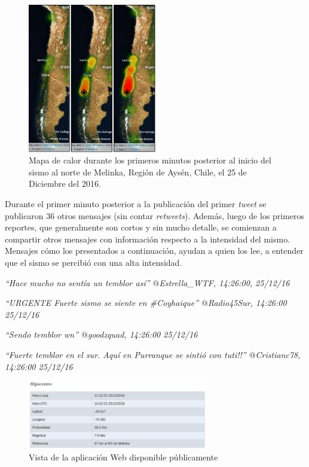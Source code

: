 	\begin{figure}[!ht]
	  \centering
	  \includegraphics[trim={0 0 0 0}, clip, width=0.5\textwidth]{imagenes/heatmap.pdf}
	  \caption{Mapa de calor durante los primeros minutos posterior al inicio del sismo al norte de Melinka, Región de Aysén, Chile, el 25 de Diciembre del 2016.}
		\label{fig:heatmap-timelapse}
	\end{figure}	
	
	Durante el primer minuto posterior a la publicación del primer \textit{tweet} se publicaron 36 otros mensajes (sin contar \textit{retweets}). Además, luego de los primeros reportes, que generalmente son cortos y sin mucho detalle, se comienzan a compartir otros mensajes con información respecto a la intensidad del mismo. Mensajes cómo los presentados a continuación, ayudan a quien los lee, a entender que el sismo se percibió con una alta intensidad. 
	

\textit{``Hace mucho no sentía un temblor así'' $@$Estrella\_WTF, 14:26:00, 25/12/16}

\textit{``URGENTE Fuerte sismo se siente en \#Coyhaique'' $@$Radio45Sur, 14:26:00 25/12/16}

\textit{``Sendo temblor wn'' $@$goodzquad, 14:26:00 25/12/16}

\textit{``Fuerte temblor en el sur. Aquí en Purranque se sintió con tuti!!'' $@$Cristianc78, 14:26:00 25/12/16}

	\begin{figure}[!h]
	  \centering
	  \includegraphics[trim={0 0 0 0}, clip, width=0.7\textwidth]{imagenes/img-25Dic-Hipocentro.png}
	  \caption{Vista de la aplicación Web disponible públicamente}
		\label{fig:25dic-hipocentro}
	\end{figure}
	
